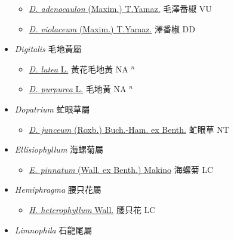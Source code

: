 \begin{itemize}
  \begin{itemize}
        \item[] \href{http://www.theplantlist.org/tpl1.1/search?q=Deinostema+adenocaulon}{\textit{D. adenocaulon} (Maxim.) T.Yamaz.}   毛澤番椒 VU
        \item[] \href{http://www.theplantlist.org/tpl1.1/search?q=Deinostema+violaceum}{\textit{D. violaceum} (Maxim.) T.Yamaz.}   澤番椒 DD
  \end{itemize}
 \item[] \textit{Digitalis} 毛地黃屬
                    
  \begin{itemize}
        \item[] \href{http://www.theplantlist.org/tpl1.1/search?q=Digitalis+lutea}{\textit{D. lutea} L.}   黃花毛地黃 NA $^n$
        \item[] \href{http://www.theplantlist.org/tpl1.1/search?q=Digitalis+purpurea}{\textit{D. purpurea} L.}   毛地黃 NA $^n$
  \end{itemize}
 \item[] \textit{Dopatrium} 虻眼草屬
                    
  \begin{itemize}
        \item[] \href{http://www.theplantlist.org/tpl1.1/search?q=Dopatrium+junceum}{\textit{D. junceum} (Roxb.) Buch.-Ham. ex Benth.}   虻眼草 NT
  \end{itemize}
 \item[] \textit{Ellisiophyllum} 海螺菊屬
                    
  \begin{itemize}
        \item[] \href{http://www.theplantlist.org/tpl1.1/search?q=Ellisiophyllum+pinnatum}{\textit{E. pinnatum} (Wall. ex Benth.) Makino}   海螺菊 LC
  \end{itemize}
 \item[] \textit{Hemiphragma} 腰只花屬
                    
  \begin{itemize}
        \item[] \href{http://www.theplantlist.org/tpl1.1/search?q=Hemiphragma+heterophyllum}{\textit{H. heterophyllum} Wall.}   腰只花 LC
  \end{itemize}
 \item[] \textit{Limnophila} 石龍尾屬
                    

\end{itemize}

